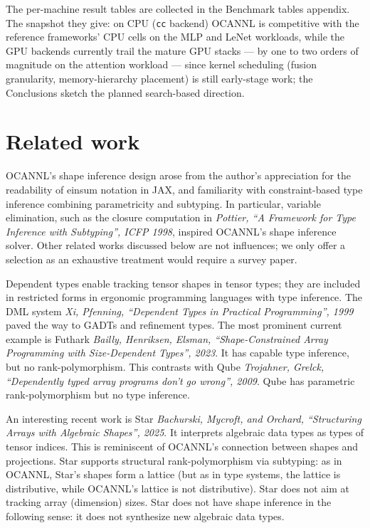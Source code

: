 \documentclass[
  10pt,
  letterpaper,
]{article}
\newcommand{\passthrough}[1]{#1}
\begin{document}
The per-machine result tables are collected in the Benchmark tables
appendix. The snapshot they give: on CPU (\passthrough{\lstinline!cc!}
backend) OCANNL is competitive with the reference frameworks' CPU cells
on the MLP and LeNet workloads, while the GPU backends currently trail
the mature GPU stacks --- by one to two orders of magnitude on the
attention workload --- since kernel scheduling (fusion granularity,
memory-hierarchy placement) is still early-stage work; the Conclusions
sketch the planned search-based direction.

\section{Related work}\label{related-work}

OCANNL's shape inference design arose from the author's appreciation for
the readability of einsum notation in JAX, and familiarity with
constraint-based type inference combining parametricity and subtyping.
In particular, variable elimination, such as the closure computation in
\emph{Pottier, ``A Framework for Type Inference with Subtyping'', ICFP
1998}, inspired OCANNL's shape inference solver. Other related works
discussed below are not influences; we only offer a selection as an
exhaustive treatment would require a survey paper.

Dependent types enable tracking tensor shapes in tensor types; they are
included in restricted forms in ergonomic programming languages with
type inference. The DML system \emph{Xi, Pfenning, ``Dependent Types in
Practical Programming'', 1999} paved the way to GADTs and refinement
types. The most prominent current example is Futhark \emph{Bailly,
Henriksen, Elsman, ``Shape-Constrained Array Programming with
Size-Dependent Types'', 2023}. It has capable type inference, but no
rank-polymorphism. This contrasts with Qube \emph{Trojahner, Grelck,
``Dependently typed array programs don't go wrong'', 2009}. Qube has
parametric rank-polymorphism but no type inference.

An interesting recent work is Star \emph{Bachurski, Mycroft, and
Orchard, ``Structuring Arrays with Algebraic Shapes'', 2025}. It
interprets algebraic data types as types of tensor indices. This is
reminiscent of OCANNL's connection between shapes and projections. Star
supports structural rank-polymorphism via subtyping: as in OCANNL,
Star's shapes form a lattice (but as in type systems, the lattice is
distributive, while OCANNL's lattice is not distributive). Star does not
aim at tracking array (dimension) sizes. Star does not have shape
inference in the following sense: it does not synthesize new algebraic
data types.
\end{document}
